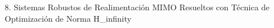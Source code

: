 8. Sistemas Robustos de Realimentación MIMO Resueltos con Técnica de Optimización de Norma H_infinity 
